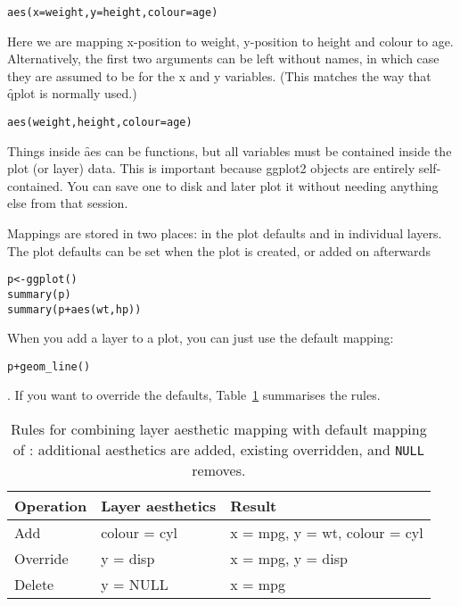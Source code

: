 \begin{alltt}
aes(x = weight, y = height, colour = age)
\end{alltt}

Here we are mapping x-position to weight, y-position to height and colour to age.  Alternatively, the first two arguments can be left without names, in which case they are assumed to be for the x and y variables.  (This matches the way that \f{qplot} is normally used.)

\begin{alltt}
aes(weight, height, colour = age)
\end{alltt}

Things inside \f{aes} can be functions, but all variables must be contained inside the plot (or layer) data.  This is important because ggplot2 objects are entirely self-contained.  You can save one to disk and later plot it without needing anything else from that session.

Mappings are stored in two places: in the plot defaults and in individual layers.  The plot defaults can be set when the plot is created, or added on afterwards

\begin{alltt}
p <- ggplot()
summary(p)
summary(p + aes(wt, hp))
\end{alltt}

When you add a layer to a plot, you can just use the default mapping: 

\begin{alltt}
p + geom_line()
\end{alltt}

\noindent.  If you want to override the defaults, Table~\ref{tbl:aes-override} summarises the rules.

\begin{table}
  \begin{center}
  \begin{tabular}{lll}
    \toprule
    Operation & Layer aesthetics  & Result \\
    \midrule
    Add       & colour = cyl & x = mpg, y = wt, colour = cyl \\
    Override  & y = disp     & x = mpg, y = disp \\
    Delete    & y = NULL     & x = mpg \\
    \bottomrule
  \end{tabular}
  \end{center}
  \caption{Rules for combining layer aesthetic mapping with default mapping of :  additional aesthetics are added, existing overridden, and {\tt NULL} removes.}
  \label{tbl:aes-override}
\end{table}


